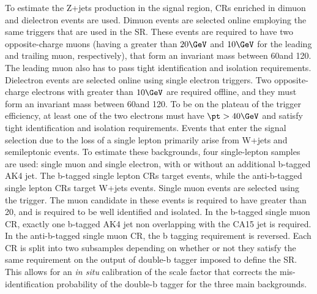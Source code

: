 To estimate the Z+jets production in the signal region, CRs enriched in dimuon and dielectron events are used.
Dimuon events are selected online employing the same \MET triggers that are used in the SR.
These events are required to have two opposite-charge muons (having a \pt greater than $20\GeV$ and $10\GeV$ for the leading and trailing muon, respectively), that form an invariant mass between 60\GeV and 120\GeV.
The leading muon also has to pass tight identification and isolation requirements.
Dielectron events are selected online using single electron triggers.%
Two opposite-charge electrons with \pt greater than $10\GeV$ are required offline, and they must form an invariant mass between 60\GeV and 120\GeV.
To be on the plateau of the trigger efficiency, at least one of the two electrons must have $\pt>40\GeV$ and satisfy tight identification and isolation requirements.
Events that enter the signal selection due to the loss of a single lepton primarily arise from W+jets and semileptonic \ttbar events.
To estimate these backgrounds, four single-lepton samples are used: single muon and single electron, with or without an additional b-tagged AK4 jet.
The b-tagged single lepton CRs target \ttbar events, while the anti-b-tagged single lepton CRs target W+jets events.
Single muon events are selected using the \MET trigger.
The muon candidate in these events is required to have \pt greater than 20\GeV, and is required to be well identified and isolated.
In the b-tagged single muon CR, exactly one b-tagged AK4 jet non overlapping with the CA15 jet is required.
In the anti-b-tagged single muon CR, the b tagging requirement is reversed.
Each CR is split into two  subsamples depending on whether or
not they satisfy the same requirement on the output of double-b tagger imposed to define the SR. This allows for an {\it in situ} calibration of the scale factor that corrects the mis-identification probability of the double-b tagger for the three main backgrounds. 


